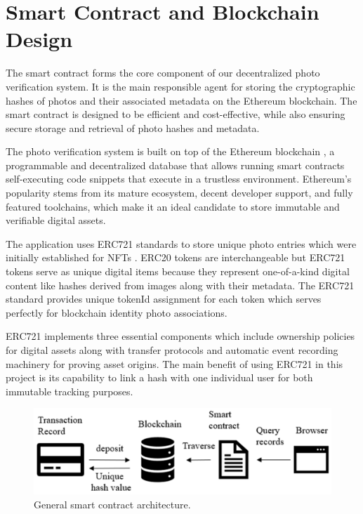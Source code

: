 \section{Smart Contract and Blockchain Design}
The smart contract forms the core component of our decentralized photo verification system. It is the main responsible agent for storing the cryptographic hashes of photos and their associated metadata on the Ethereum blockchain. The smart contract is designed to be efficient and cost-effective, while also ensuring secure storage and retrieval of photo hashes and metadata.

The  photo verification system is built on top of the Ethereum blockchain \cite{ethereuem}, a programmable and decentralized database that allows running smart contracts self-executing code snippets that execute in a trustless environment. Ethereum's popularity stems from its mature ecosystem, decent developer support, and fully featured toolchains, which make it an ideal candidate to store immutable and verifiable digital assets.

The application uses ERC721 standards to store unique photo entries which were initially established for NFTs  \cite{erc721}. ERC20 tokens are interchangeable but ERC721 tokens serve as unique digital items because they represent one-of-a-kind digital content like hashes derived from images along with their metadata. The ERC721 standard provides unique tokenId assignment for each token which serves perfectly for blockchain identity photo associations.

ERC721 implements three essential components which include ownership policies for digital assets along with transfer protocols and automatic event recording machinery for proving asset origins. The main benefit of using ERC721 in this project is its capability to link a hash with one individual user for both immutable tracking purposes.

\begin{figure}
    \centering
    \includegraphics[scale=0.1]{images/smartContractArch.png}
    \caption{General smart contract architecture.}
    \label{fig:smartContractArch}
\end{figure}

